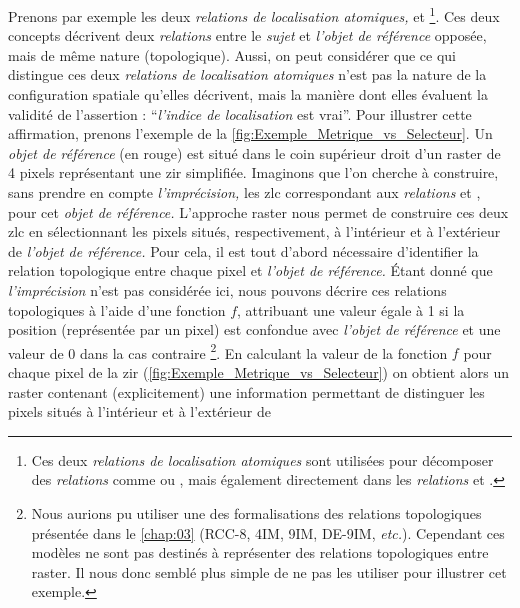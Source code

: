 Prenons par exemple les deux \emph{relations de localisation
  atomiques,}  et
 \footnote{Ces deux \emph{relations de
    localisation atomiques} sont utilisées pour décomposer des
  \emph{relations} comme \protect{}
  ou \protect{}, mais également
  directement dans les \emph{relations}
  \protect{} et
  \protect{}.}. Ces deux concepts
décrivent deux \emph{relations} entre le \emph{sujet} et \emph{l'objet
  de référence} opposée, mais de même nature (\ie topologique). Aussi,
on peut considérer que ce qui distingue ces deux \emph{relations de
  localisation atomiques} n'est pas la nature de la configuration
spatiale qu'elles décrivent, mais la manière dont elles évaluent la
validité de l'assertion : \enquote{\emph{l'indice de localisation} est
  vrai}. Pour illustrer cette affirmation, prenons l'exemple de la
\autoref{fig:Exemple_Metrique_vs_Selecteur}. Un \emph{objet de
  référence} (en rouge) est situé dans le coin supérieur droit d'un
raster de 4 pixels représentant une \ac{zir} simplifiée. Imaginons que
l'on cherche à construire, sans prendre en compte
\emph{l'imprécision,} les \ac{zlc} correspondant aux \emph{relations}
 et , pour cet \emph{objet
  de référence.} L'approche raster nous permet de construire ces deux
\ac{zlc} en sélectionnant les pixels situés, respectivement, à
l'intérieur et à l'extérieur de \emph{l'objet de référence.} Pour
cela, il est tout d'abord nécessaire d'identifier la relation
topologique entre chaque pixel et \emph{l'objet de référence.} Étant
donné que \emph{l'imprécision} n'est pas considérée ici, nous pouvons
décrire ces relations topologiques à l'aide d'une fonction \(f\),
attribuant une valeur égale à 1 si la position (représentée par un
pixel) est confondue avec \emph{l'objet de référence} et une valeur de
0 dans la cas contraire \footnote{Nous aurions pu utiliser une des
  formalisations des relations topologiques présentée dans le
  \autoref{chap:03} (RCC-8, 4IM, 9IM, DE-9IM, \emph{etc.}). Cependant
  ces modèles ne sont pas destinés à représenter des relations
  topologiques entre raster. Il nous donc semblé plus simple de ne pas
  les utiliser pour illustrer cet exemple.}. En calculant la valeur de
la fonction \(f\) pour chaque pixel de la \ac{zir}
(\autoref{fig:Exemple_Metrique_vs_Selecteur}) on obtient alors un
raster contenant (explicitement) une information permettant de
distinguer les pixels situés à l'intérieur et à l'extérieur de
